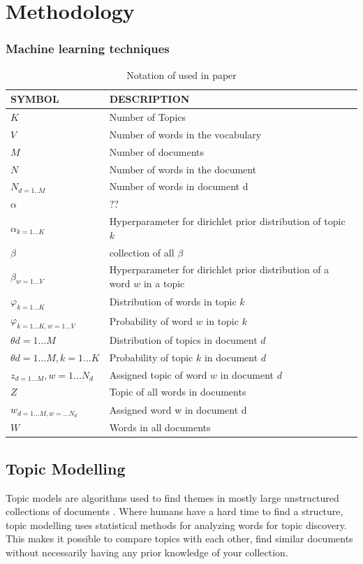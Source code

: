 \chapter{Methodology}  \label{ch:methodology}

\subsection{Machine learning techniques}


\begin{table}[h]
\centering
 \begin{tabular}{l l} 
 \hline
 SYMBOL & DESCRIPTION \\ 
 \hline
 $K$ & Number of Topics \\  
 $V$ & Number of words in the vocabulary \\
 $M$ & Number of documents \\
 $N$ & Number of words in the document \\
 $N_{d=1..M}$ & Number of words in document d\\
 $\alpha$ & ?? \\
 $\alpha_{k=1...K}$ & Hyperparameter for dirichlet prior distribution of topic $k$ \\
 $\beta$ & collection of all $\beta$ \\
 $\beta_{w=1...V}$ & Hyperparameter for dirichlet prior distribution of a word $w$ in a topic \\
 $\varphi_{k=1...K}$ & Distribution of words in topic $k$ \\
 $\varphi_{k=1...K, w=1...V}$ & Probability of  word $w$ in topic $k$  \\
 $\theta{d=1...M}$ & Distribution of topics in document $d$  \\
 $\theta{d=1...M, k=1...K}$ & Probability of  topic $k$ in document $d$ \\
 $z_{d=1...M}, w=1...N_d$ & Assigned topic of word $w$ in document $d$\\
 $Z$ & Topic of all words in documents \\
 $w_{d=1...M, w=...N_d}$ & Assigned word w in document d \\ 
 $W$ & Words in all documents \\ 

 

 
 \hline
 \end{tabular}
\caption{Notation of used in paper}
\label{tab:table1}
\end{table}

\section{Topic Modelling}
Topic models are algorithms used to find themes in mostly large unstructured collections of documents \cite{Blei2010ProbabilisticModels}. Where humans have a hard time to find a structure, topic modelling uses statistical methods for analyzing words for topic discovery. This makes it possible to compare topics with each other, find similar documents without necessarily having any prior knowledge of your collection. 



